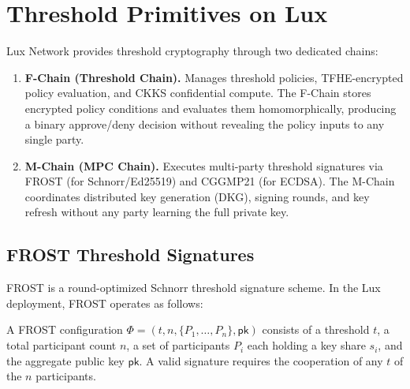 

\section{Threshold Primitives on Lux}
\label{sec:primitives}

Lux Network provides threshold cryptography through two dedicated chains:

\begin{enumerate}
    \item \textbf{F-Chain (Threshold Chain).} Manages threshold policies,
    TFHE-encrypted policy evaluation, and CKKS confidential compute. The
    F-Chain stores encrypted policy conditions and evaluates them
    homomorphically, producing a binary approve/deny decision without
    revealing the policy inputs to any single party.

    \item \textbf{M-Chain (MPC Chain).} Executes multi-party threshold
    signatures via FROST (for Schnorr/Ed25519) and CGGMP21 (for ECDSA).
    The M-Chain coordinates distributed key generation (DKG), signing
    rounds, and key refresh without any party learning the full private key.
\end{enumerate}

\subsection{FROST Threshold Signatures}

FROST \cite{komlo2020frost} is a round-optimized Schnorr threshold signature
scheme. In the Lux deployment, FROST operates as follows:

\begin{definition}
A FROST configuration $\Phi = (t, n, \{P_1, \ldots, P_n\}, \mathsf{pk})$
consists of a threshold $t$, a total participant count $n$, a set of
participants $P_i$ each holding a key share $s_i$, and the aggregate
public key $\mathsf{pk}$. A valid signature requires the cooperation
of any $t$ of the $n$ participants.
\end{definition}

